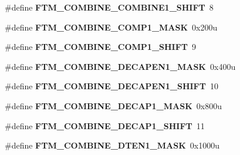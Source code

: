 \begin{DoxyCompactItemize}
\item 
\hypertarget{group___f_t_m___register___masks_gaf9a5abb2341af83a58d95ccb704d8a11}{}\#define {\bfseries F\+T\+M\+\_\+\+C\+O\+M\+B\+I\+N\+E\+\_\+\+C\+O\+M\+B\+I\+N\+E1\+\_\+\+S\+H\+I\+F\+T}~8\label{group___f_t_m___register___masks_gaf9a5abb2341af83a58d95ccb704d8a11}

\item 
\hypertarget{group___f_t_m___register___masks_ga24a8dd787f2e00cde644bf23a4c16123}{}\#define {\bfseries F\+T\+M\+\_\+\+C\+O\+M\+B\+I\+N\+E\+\_\+\+C\+O\+M\+P1\+\_\+\+M\+A\+S\+K}~0x200u\label{group___f_t_m___register___masks_ga24a8dd787f2e00cde644bf23a4c16123}

\item 
\hypertarget{group___f_t_m___register___masks_ga58bf0f457a2ce6f35ad0f75115bbcc90}{}\#define {\bfseries F\+T\+M\+\_\+\+C\+O\+M\+B\+I\+N\+E\+\_\+\+C\+O\+M\+P1\+\_\+\+S\+H\+I\+F\+T}~9\label{group___f_t_m___register___masks_ga58bf0f457a2ce6f35ad0f75115bbcc90}

\item 
\hypertarget{group___f_t_m___register___masks_ga75b422313fe76b13eb70022f15120d3f}{}\#define {\bfseries F\+T\+M\+\_\+\+C\+O\+M\+B\+I\+N\+E\+\_\+\+D\+E\+C\+A\+P\+E\+N1\+\_\+\+M\+A\+S\+K}~0x400u\label{group___f_t_m___register___masks_ga75b422313fe76b13eb70022f15120d3f}

\item 
\hypertarget{group___f_t_m___register___masks_ga6fa24cab05a8839e131ce86612a77330}{}\#define {\bfseries F\+T\+M\+\_\+\+C\+O\+M\+B\+I\+N\+E\+\_\+\+D\+E\+C\+A\+P\+E\+N1\+\_\+\+S\+H\+I\+F\+T}~10\label{group___f_t_m___register___masks_ga6fa24cab05a8839e131ce86612a77330}

\item 
\hypertarget{group___f_t_m___register___masks_ga8fdebd40c2860511d58ce7e15cf7a875}{}\#define {\bfseries F\+T\+M\+\_\+\+C\+O\+M\+B\+I\+N\+E\+\_\+\+D\+E\+C\+A\+P1\+\_\+\+M\+A\+S\+K}~0x800u\label{group___f_t_m___register___masks_ga8fdebd40c2860511d58ce7e15cf7a875}

\item 
\hypertarget{group___f_t_m___register___masks_ga888ebd3f18cacc007fa0cd2073cdca1d}{}\#define {\bfseries F\+T\+M\+\_\+\+C\+O\+M\+B\+I\+N\+E\+\_\+\+D\+E\+C\+A\+P1\+\_\+\+S\+H\+I\+F\+T}~11\label{group___f_t_m___register___masks_ga888ebd3f18cacc007fa0cd2073cdca1d}

\item 
\hypertarget{group___f_t_m___register___masks_ga9d461bde34f5c5fad944a58e61c3fb44}{}\#define {\bfseries F\+T\+M\+\_\+\+C\+O\+M\+B\+I\+N\+E\+\_\+\+D\+T\+E\+N1\+\_\+\+M\+A\+S\+K}~0x1000u\label{group___f_t_m___register___masks_ga9d461bde34f5c5fad944a58e61c3fb44}


\end{DoxyCompactItemize}
